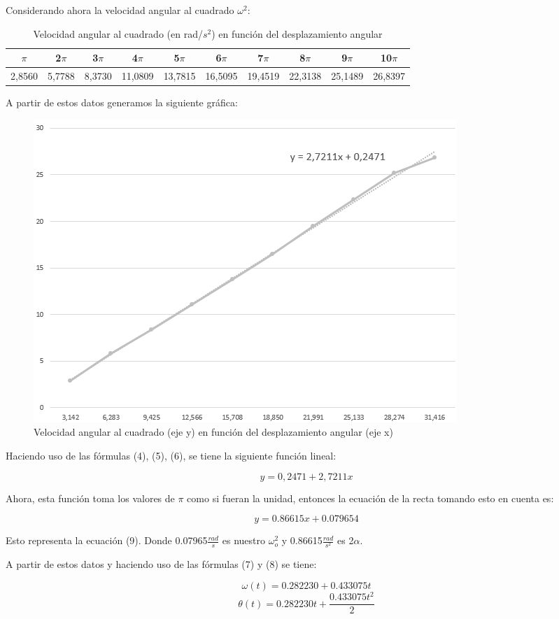 \documentclass[a4paper]{article}
\begin{document}
Considerando ahora la velocidad angular al cuadrado $\omega^2$: 

\begin{table}[!ht]
    \centering
    \begin{tabular}{|c|c|c|c|c|c|c|c|c|c|}
    \hline
        $\pi$ & 2$\pi$ & 3$\pi$ & 4$\pi$ & 5$\pi$ & 6$\pi$ & 7$\pi$ & 8$\pi$ & 9$\pi$ & 10$\pi$  \\ \hline
        2,8560  & 5,7788  & 8,3730  & 11,0809  & 13,7815  & 16,5095  & 19,4519  & 22,3138  & 25,1489  & 26,8397  \\ \hline
    \end{tabular}
    \caption{Velocidad angular al cuadrado (en rad/$s^2$) en función del desplazamiento angular}
\end{table}

A partir de estos datos generamos la siguiente gráfica: 
\begin{figure} [H]
    \centering
    \includegraphics[width=0.6 \textwidth]{Vang^2vsDang.png}
    \caption{Velocidad angular al cuadrado (eje y) en función del desplazamiento angular (eje x)}
    \end{figure}
    
Haciendo uso de las fórmulas (4), (5), (6), se tiene la siguiente función lineal:

\[ y= 0,2471 + 2,7211x\]

Ahora, esta función toma los valores de $\pi$ como si fueran la unidad, entonces la ecuación de la recta tomando esto en cuenta es:

\[ y= 0.86615x+0.079654\]

Esto representa la ecuación (9). Donde 0.07965$\frac{rad}{s}$ es nuestro $\omega_o^2$ y 0.86615$\frac{rad}{s^2}$ es 2$\alpha$.

A partir de estos datos y haciendo uso de las fórmulas (7) y (8) se tiene:

\[\omega(t)=0.282230+0.433075t\]
\[\theta(t)=0.282230t+\frac{0.433075 t^2}{2}\]
\end{document}
